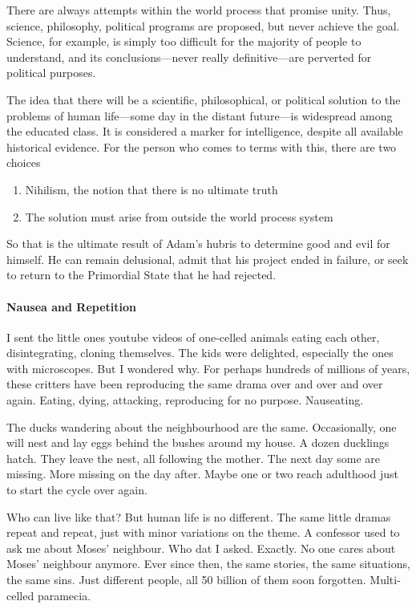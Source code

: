 There are always attempts within the world process that promise unity. Thus, science, philosophy, political programs are proposed, but never achieve the goal. Science, for example, is simply too difficult for the majority of people to understand, and its conclusions—never really definitive—are perverted for political purposes.

The idea that there will be a scientific, philosophical, or political solution to the problems of human life—some day in the distant future—is widespread among the educated class. It is considered a marker for intelligence, despite all available historical evidence. For the person who comes to terms with this, there are two choices

\begin{enumerate}
\item Nihilism, the notion that there is no ultimate truth 
\item The solution must arise from outside the world process system 
\end{enumerate}
So that is the ultimate result of Adam's hubris to determine good and evil for himself. He can remain delusional, admit that his project ended in failure, or seek to return to the Primordial State that he had rejected.

\paragraph{Nausea and Repetition}
I sent the little ones youtube videos of one-celled animals eating each other, disintegrating, cloning themselves. The kids were delighted, especially the ones with microscopes. But I wondered why. For perhaps hundreds of millions of years, these critters have been reproducing the same drama over and over and over again. Eating, dying, attacking, reproducing for no purpose. Nauseating.

The ducks wandering about the neighbourhood are the same. Occasionally, one will nest and lay eggs behind the bushes around my house. A dozen ducklings hatch. They leave the nest, all following the mother. The next day some are missing. More missing on the day after. Maybe one or two reach adulthood just to start the cycle over again.

Who can live like that? But human life is no different. The same little dramas repeat and repeat, just with minor variations on the theme. A confessor used to ask me about Moses' neighbour. Who dat I asked. Exactly. No one cares about Moses' neighbour anymore. Ever since then, the same stories, the same situations, the same sins. Just different people, all 50 billion of them soon forgotten. Multi-celled paramecia.

